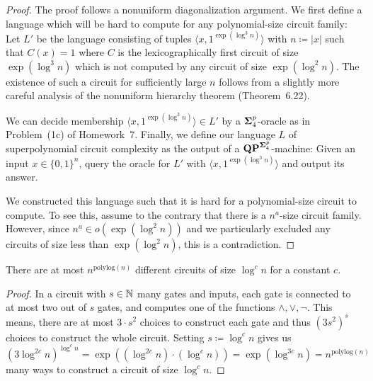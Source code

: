 \documentclass[12pt]{article}
\theoremstyle{definition}
\begin{document}
\begin{proof}
  The proof follows a nonuniform diagonalization argument. We first define
  a language which will be hard to compute for any polynomial-size circuit
  family:
  Let $L'$ be the language consisting of tuples
  $\langle x, 1^{\exp(\log^3 n)} \rangle$
  with $n \coloneqq |x|$
  such that $C(x) = 1$ where $C$ is the
  lexicographically first circuit of size $\exp(\log^3 n)$ which is not
  computed by any circuit of size $\exp(\log^2 n)$.
  The existence of such a circuit for sufficiently large $n$ follows from a
  slightly more careful analysis of the nonuniform hierarchy theorem
  (Theorem~6.22).

  We can decide membership $\langle x, 1^{\exp(\log^3 n)} \rangle \in L'$
  by a $\mathbf{\Sigma}^p_4$-oracle as in Problem~(1c) of Homework~7.
  Finally, we define our language $L$ of superpolynomial circuit complexity
  as the output of a $\mathbf{QP}^{\mathbf{\Sigma}^p_4}$-machine: Given an input
  $x \in \{0,1\}^n$, query the oracle for $L'$ with
  $\langle x, 1^{\exp(\log^3 n)} \rangle$ and output its answer.

  We constructed this language such that it is hard for a polynomial-size
  circuit to compute. To see this, assume to the contrary that there is
  a $n^a$-size circuit family.
  However, since $n^a \in o(\exp(\log^2 n))$ and we particularly excluded any
  circuits of size less than $\exp(\log^2 n)$, this is a contradiction.
\end{proof}

\begin{lemma}
  \label{lem:num-of-circs}
  There are at most $n^{\mathrm{polylog}(n)}$ different circuits of size
  $\log^c n$ for a constant $c$.
\end{lemma}

\begin{proof}
  In a circuit with $s \in {\mathbb{N}}$ many gates and inputs, each gate is connected to
  at most two out of $s$ gates, and computes one of the functions
  $\land, \lor, \neg$.
  This means, there are at most $3 \cdot s^2$ choices to construct each gate
  and thus $(3 s^2)^s$ choices to construct the whole circuit.
  Setting $s \coloneqq \log^c n$ gives us
  \[
    (3 \log^{2c} n)^{\log^c n}
    =
    \exp((\log^{2c} n) \cdot (\log^c n))
    =
    \exp(\log^{3c} n)
    =
    n^{\mathrm{polylog}(n)}
  \]
  many ways to construct a circuit of size $\log^c n$.
\end{proof}

\bigskip
\end{document}
